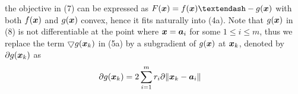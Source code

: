 the objective in (7) can be expressed as $F(\Bx) = f(\Bx) –- g(\Bx)$ with both $f(\mbox{\boldmath$x$})$ and $g(\mbox{\boldmath$x$})$ convex, hence it fits naturally into (4a).
%
Note that $g(\mbox{\boldmath$x$})$ in (8) is not differentiable at the point where $\mbox{\boldmath$x$} = \mbox{\boldmath$a$}_i$ for some $1 \leq i \leq m$, thus we replace the term $\bigtriangledown g(\mbox{\boldmath$x$}_k)$ in (5a) by a subgradient \cite{Nes} of $g(\mbox{\boldmath$x$})$ at $\mbox{\boldmath$x$}_k$, denoted by $\partial g(\mbox{\boldmath$x$}_k)$ as
\begin{equation} %
\nonumber
\begin{aligned}
\partial g{(\Bx_k)} & = 2 \sum^m_{i = 1} r_i \partial \|\Bx_k - \Ba_i\| 
\end{aligned}
\end{equation}
